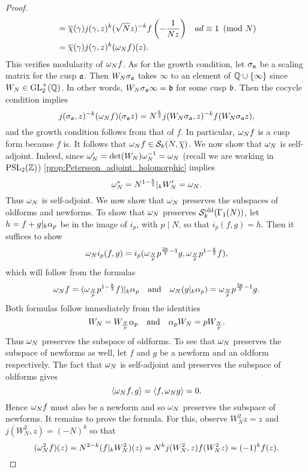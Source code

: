 \begin{proof}
\begin{align*}
        &= \overline{\chi}(\gamma)j(\gamma,z)^{k}(\sqrt{N}z)^{-k}f\left(-\frac{1}{Nz}\right) && \text{$ad \equiv 1 \ \left(\text{mod }N\right)$} \\
        &= \overline{\chi}(\gamma)j(\gamma,z)^{k}(\omega_{N}f)(z).
      \end{align*}
      This verifies modularity of $\omega_{N}f$. As for the growth condition, let $\sigma_{\mathfrak{a}}$ be a scaling matrix for the cusp $\mathfrak{a}$. Then $W_{N}\sigma_{\mathfrak{a}}$ takes $\infty$ to an element of $\mathbb{Q} \cup \{\infty\}$ since $W_{N} \in \mathrm{GL}_{2}^{+}(\mathbb{Q})$. In other words, $W_{N}\sigma_{\mathfrak{a}}\infty = \mathfrak{b}$ for some cusp $\mathfrak{b}$. Then the cocycle condition implies
      \[
        j(\sigma_{\mathfrak{a}},z)^{-k}(\omega_{N}f)(\sigma_{\mathfrak{a}}z) = N^{\frac{k}{2}}j(W_{N}\sigma_{\mathfrak{a}},z)^{-k}f(W_{N}\sigma_{\mathfrak{a}}z),
      \]
      and the growth condition follows from that of $f$. In particular, $\omega_{N}f$ is a cusp form because $f$ is. It follows that $\omega_{N}f \in \mathcal{S}_{k}(N,\overline{\chi})$. We now show that $\omega_{N}$ is self-adjoint. Indeed, since $\omega_{N}' = \det(W_{N})\omega_{N}^{-1} = \omega_{N}$ (recall we are working in $\mathrm{PSL}_{2}(\mathbb{Z})$) \cref{prop:Petersson_adjoint_holomorphic} implies
      \[
        \omega_{N}^{\ast} = N^{1-\frac{k}{2}}|_{k}W_{N}' = \omega_{N}.
      \]
      Thus $\omega_{N}$ is self-adjoint.
      We now show that $\omega_{N}$ preserves the subspaces of oldforms and newforms. To show that $\omega_{N}$ preserves $\mathcal{S}_{k}^{\text{old}}(\Gamma_{1}(N))$, let $h = f+g|_{k}\alpha_{p}$ be in the image of $i_{p}$, with $p \mid N$, so that $i_{p}(f,g) = h$. Then it suffices to show
      \[
        \omega_{N}i_{p}(f,g) = i_{p}(\omega_{\frac{N}{p}}p^{\frac{3k}{2}-1}g,\omega_{\frac{N}{p}}p^{1-\frac{k}{2}}f),
      \]
      which will follow from the formulas
      \[
        \omega_{N}f = (\omega_{\frac{N}{p}}p^{1-\frac{k}{2}}f)|_{k}\alpha_{p} \quad \text{and} \quad \omega_{N}(g|_{k}\alpha_{p}) = \omega_{\frac{N}{p}}p^{\frac{3k}{2}-1}g.
      \]
      Both formulas follow immediately from the identities
      \[
        W_{N} = W_{\frac{N}{p}}\alpha_{p} \quad \text{and} \quad \alpha_{p}W_{N} = pW_{\frac{N}{p}}.
      \]
      Thus $\omega_{N}$ preserves the subspace of oldforms. To see that $\omega_{N}$ preserves the subspace of newforms as well, let $f$ and $g$ be a newform and an oldform respectively. The fact that $\omega_{N}$ is self-adjoint and preserves the subspace of oldforms gives
      \[
        \langle\omega_{N}f,g\rangle = \langle f,\omega_{N}g\rangle = 0.
      \]
      Hence $\omega_{N}f$ must also be a newform and so $\omega_{N}$ preserves the subspace of newforms. It remains to prove the formula. For this, observe $W_{N}^{2}z = z$ and $j(W_{N}^{2},z) = (-N)^{k}$ so that
      \[
        (\omega_{N}^{2}f)(z) = N^{2-k}(f|_{k}W_{N}^{2})(z) = N^{k}j(W_{N}^{2},z)f(W_{N}^{2}z) = (-1)^{k}f(z).
      \]
    \end{proof}

